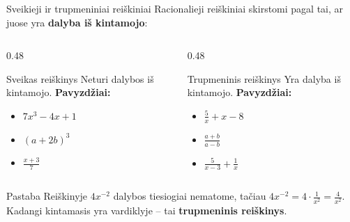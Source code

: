 \documentclass[aspectratio=169, 10pt]{beamer}
\begin{document}
\begin{frame}{Sveikieji ir trupmeniniai reiškiniai}
    Racionalieji reiškiniai skirstomi pagal tai, ar juose yra \textbf{dalyba iš kintamojo}:

    \begin{columns}[T]
        \begin{column}{0.48\textwidth}
            \begin{block}{Sveikas reiškinys}
                Neturi dalybos iš kintamojo.
                \vfill
                \textbf{Pavyzdžiai:}
                \begin{itemize}
                    \item $7x^3 - 4x + 1$
                    \item $(a+2b)^3$
                    \item $\frac{x+3}{7}$
                \end{itemize}
            \end{block}
        \end{column}

        \begin{column}{0.48\textwidth}
            \begin{block}{Trupmeninis reiškinys}
                Yra dalyba iš kintamojo.
                \vfill
                \textbf{Pavyzdžiai:}
                \begin{itemize}
                    \item $\frac{5}{x} + x - 8$
                    \item $\frac{a+b}{a-b}$
                    \item $\frac{5}{x-3} + \frac{1}{x}$
                \end{itemize}
            \end{block}
        \end{column}
    \end{columns}

    \vspace{0.3cm}
    \begin{alertblock}{Pastaba}
        Reiškinyje $4x^{-2}$ dalybos tiesiogiai nematome, tačiau $4x^{-2} = 4 \cdot \frac{1}{x^2} = \frac{4}{x^2}$. Kadangi kintamasis yra vardiklyje – tai \textbf{trupmeninis reiškinys}.
    \end{alertblock}
\end{frame}
\end{document}
